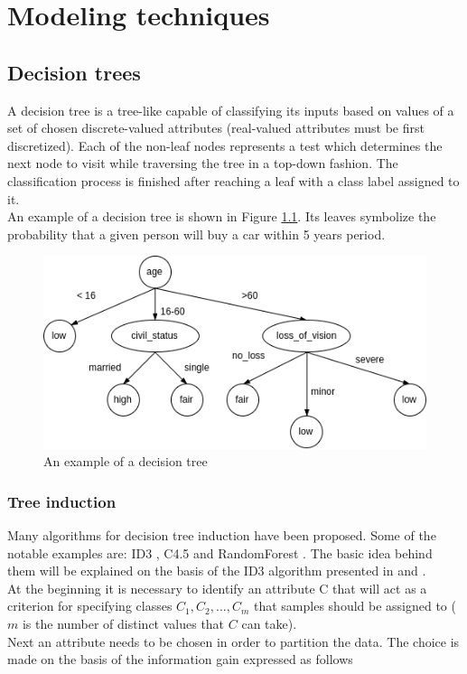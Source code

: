 \documentclass[11pt,oneside, a4paper]{report}
\begin{document}
\chapter{Modeling techniques}

\section{Decision trees}
A decision tree is a tree-like capable of classifying its inputs based on values of a set of chosen discrete-valued attributes (real-valued attributes must be first discretized). Each of the non-leaf nodes represents a test which determines the next node to visit while traversing the tree in a top-down fashion. The classification process is finished after reaching a leaf with a class label assigned to it.
\\
An example of a decision tree is shown in Figure \ref{fig:decision-tree}. Its leaves symbolize the probability that a given person will buy a car within  5 years period.

\begin{figure}[htp]
\centering
\includegraphics[scale=0.70]{figures/decision-tree.png}
\caption{An example of a decision tree}
\label{fig:decision-tree}
\end{figure}

\subsection{Tree induction}
Many algorithms for decision tree induction have been proposed. Some of the notable examples are: ID3 \cite{QUINLAN1986}, C4.5 \cite{QUINLAN1993} and RandomForest \cite{HO1995}. The basic idea behind them will be explained on the basis of the ID3 algorithm presented in \cite{HAN2005} and \cite{QUINLAN1986}.
\\
At the beginning it is necessary to identify an attribute C that will act as a criterion for specifying classes ${C_1, C_2, ... , C_m}$ that samples should be assigned to ($m$ is the number of distinct values that $C$ can take).\\
Next an attribute needs to be chosen in order to partition the data. The choice is made on the basis of the information gain expressed as follows
\end{document}

